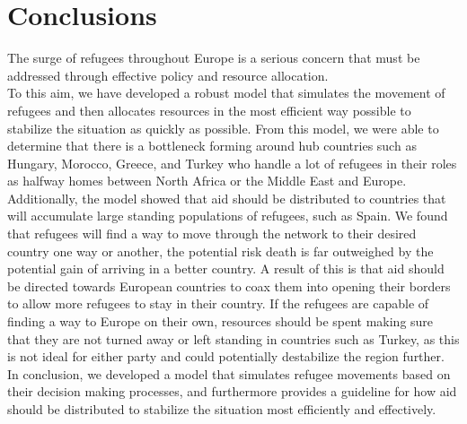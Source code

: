 \documentclass{article}
\begin{document}
\section{Conclusions}
The surge of refugees throughout Europe is a serious concern that must be addressed through effective policy and resource allocation. \\
To this aim, we have developed a robust model that simulates the movement of refugees and then allocates resources in the most efficient way possible to stabilize the situation as quickly as possible. From this model, we were able to determine that there is a bottleneck forming around hub countries such as Hungary, Morocco, Greece, and Turkey who handle a lot of refugees in their roles as halfway homes between North Africa or the Middle East and Europe. Additionally, the model showed that aid should be distributed to countries that will accumulate large standing populations of refugees, such as Spain. We found that refugees will find a way to move through the network to their desired country one way or another, the potential risk death is far outweighed by the potential gain of arriving in a better country. A result of this is that aid should be directed towards European countries to coax them into opening their borders to allow more refugees to stay in their country. If the refugees are capable of finding a way to Europe on their own, resources should be spent making sure that they are not turned away or left standing in countries such as Turkey, as this is not ideal for either party and could potentially destabilize the region further. In conclusion, we developed a model that simulates refugee movements based on their decision making processes, and furthermore provides a guideline for how aid should be distributed to stabilize the situation most efficiently and effectively.
\end{document}
